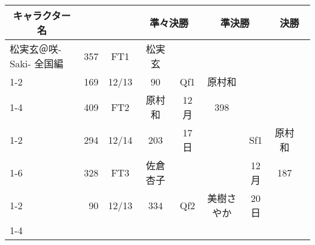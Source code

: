\documentclass[UTF8, punct=kaiming, zihao=-4]{ctexbook}
\newcommand{\mincho}{\minchoe\CJKfamily{mincho}}
\begin{document}
\newcommand{\Madomagi}{劇場版~魔法少女まどか$\!\!$☆$\!\!$マギカ$\!\!$[$\!\!$新編$\!\!$]$\!\!$叛逆の物語}

{\mincho{}
\begin{longtable}{lrccccccc}
\hline
\multicolumn{1}{|c|}{\bf キャラクター名}                              & \multicolumn{1}{c}{}     &                             & \multicolumn{2}{|c|}{\bf 準々決勝}                                 & \multicolumn{2}{c|}{\bf 準決勝}                                  & \multicolumn{2}{c|}{\bf 決勝}                                 \\ \hline
\multicolumn{1}{|l|}{松実玄＠咲-Saki- 全国編}                    & \multicolumn{1}{r|}{357} & \multicolumn{1}{c|}{FT1}    & \multicolumn{1}{c|}{松実玄}   & \multicolumn{1}{c|}{}       & \multicolumn{1}{c|}{}      & \multicolumn{1}{c|}{}       & \multicolumn{1}{c|}{}    & \multicolumn{1}{c|}{}       \\ \cline{1-2}
\multicolumn{1}{|l|}{神代小蒔＠咲-Saki- 全国編}                   & \multicolumn{1}{r|}{169} & \multicolumn{1}{c|}{12/13} & \multicolumn{1}{c|}{90}    & \multicolumn{1}{c|}{Qf1}    & \multicolumn{1}{c|}{原村和}   & \multicolumn{1}{c|}{}       & \multicolumn{1}{c|}{}    & \multicolumn{1}{c|}{}       \\ \cline{1-4}
\multicolumn{1}{|l|}{原村和＠咲-Saki- 全国編}                    & \multicolumn{1}{r|}{409} & \multicolumn{1}{c|}{FT2}    & \multicolumn{1}{c|}{原村和}   & \multicolumn{1}{c|}{12月} & \multicolumn{1}{c|}{398}   & \multicolumn{1}{c|}{}       & \multicolumn{1}{c|}{}    & \multicolumn{1}{c|}{}       \\ \cline{1-2}
\multicolumn{1}{|l|}{新子憧＠咲-Saki- 全国編}                    & \multicolumn{1}{r|}{294} & \multicolumn{1}{c|}{12/14} & \multicolumn{1}{c|}{203}   & \multicolumn{1}{c|}{17日}       & \multicolumn{1}{c|}{}      & \multicolumn{1}{c|}{Sf1}    & \multicolumn{1}{c|}{原村和} & \multicolumn{1}{c|}{}       \\ \cline{1-6}
\multicolumn{1}{|l|}{佐倉杏子＠\Madomagi}  & \multicolumn{1}{r|}{328} & \multicolumn{1}{c|}{FT3}    & \multicolumn{1}{c|}{佐倉杏子}  & \multicolumn{1}{c|}{}       & \multicolumn{1}{c|}{}      & \multicolumn{1}{c|}{12月} & \multicolumn{1}{c|}{187} & \multicolumn{1}{c|}{}       \\ \cline{1-2}
\multicolumn{1}{|l|}{アリス・カータレット＠きんいろモザイク}                & \multicolumn{1}{r|}{90}  & \multicolumn{1}{c|}{12/13} & \multicolumn{1}{c|}{334}   & \multicolumn{1}{c|}{Qf2}    & \multicolumn{1}{c|}{美樹さやか} & \multicolumn{1}{c|}{20日}       & \multicolumn{1}{c|}{}    & \multicolumn{1}{c|}{}       \\ \cline{1-4}

\end{longtable}}
\end{document}
